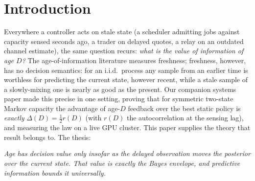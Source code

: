 \documentclass[11pt]{article}
\begin{document}
\section{Introduction}\label{sec:intro}

Everywhere a controller acts on stale state (a scheduler admitting jobs
against capacity sensed seconds ago, a trader on delayed quotes, a relay on
an outdated channel estimate), the same question recurs: \emph{what is the
value of information of age $D$?} The age-of-information literature
\cite{yates21} measures freshness; freshness, however, has no decision
semantics: for an i.i.d.\ process any sample from an earlier time is
worthless for predicting the current state, however recent, while a stale
sample of a slowly-mixing one is nearly as good as the present. Our
companion systems paper \cite{infocom} made this precise in one setting,
proving that for symmetric two-state Markov capacity the advantage of
age-$D$ feedback over the best static policy is \emph{exactly}
$\Delta(D)=\tfrac12 r(D)$ (with $r(D)$ the autocorrelation at the sensing lag), and
measuring the law on a live GPU cluster. This paper supplies the theory that
result belongs to. The thesis:
\begin{center}\emph{Age has decision value only insofar as the delayed
observation moves the posterior over the current state. That value is
exactly the Bayes envelope, and predictive information bounds it
universally.}\end{center}
\end{document}
